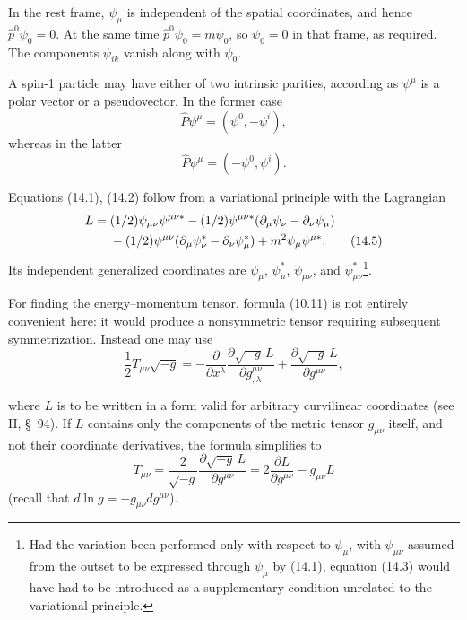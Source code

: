In the rest frame, $\psi_\mu$ is independent of the spatial coordinates, and hence $\widehat p^0\psi_0=0$. At the same time $\widehat p^0\psi_0=m\psi_0$, so $\psi_0=0$ in that frame, as required. The components $\psi_{ik}$ vanish along with $\psi_0$.

A spin-1 particle may have either of two intrinsic parities, according as $\psi^\mu$ is a polar vector or a pseudovector. In the former case
\[
\widehat P\psi^\mu=(\psi^0,-\psi^i),
\]
whereas in the latter
\[
\widehat P\psi^\mu=(-\psi^0,\psi^i).
\]

Equations (14.1), (14.2) follow from a variational principle with the Lagrangian
\begin{align}
L={}&(1/2)\psi_{\mu\nu}\psi^{\mu\nu*}
-(1/2)\psi^{\mu\nu*}(\partial_\mu\psi_\nu-\partial_\nu\psi_\mu)
\notag\\
&-(1/2)\psi^{\mu\nu}(\partial_\mu\psi^*_\nu-\partial_\nu\psi^*_\mu)
+m^2\psi_\mu\psi^{\mu*}.
\tag{14.5}
\end{align}
Its independent generalized coordinates are $\psi_\mu$, $\psi^*_\mu$, $\psi_{\mu\nu}$, and $\psi^*_{\mu\nu}$\footnote{Had the variation been performed only with respect to $\psi_\mu$, with $\psi_{\mu\nu}$ assumed from the outset to be expressed through $\psi_\mu$ by (14.1), equation (14.3) would have had to be introduced as a supplementary condition unrelated to the variational principle.}.

For finding the energy--momentum tensor, formula (10.11) is not entirely convenient here: it would produce a nonsymmetric tensor requiring subsequent symmetrization. Instead one may use
\begin{equation}
\frac12 T_{\mu\nu}\sqrt{-g}
=-\frac{\partial}{\partial x^\lambda}
\frac{\partial\sqrt{-g}\,L}{\partial g^{\mu\nu}_{,\lambda}}
+\frac{\partial\sqrt{-g}\,L}{\partial g^{\mu\nu}},
\tag{14.6}
\end{equation}

where $L$ is to be written in a form valid for arbitrary curvilinear coordinates (see II, \S~94). If $L$ contains only the components of the metric tensor $g_{\mu\nu}$ itself, and not their coordinate derivatives, the formula simplifies to
\[
T_{\mu\nu}=\frac{2}{\sqrt{-g}}\frac{\partial\sqrt{-g}\,L}{\partial g^{\mu\nu}}
=2\frac{\partial L}{\partial g^{\mu\nu}}-g_{\mu\nu}L
\]
(recall that $d\ln g=-g_{\mu\nu}dg^{\mu\nu}$).

